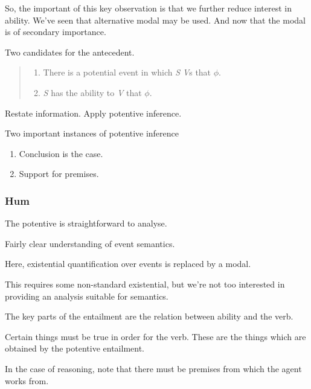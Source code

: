 \begin{note}
  So, the important of this key observation is that we further reduce interest in ability.
  We've seen that alternative modal may be used.
  And now that the modal is of secondary importance.
  
  
  
  Two candidates for the antecedent.
\begin{quote}
  \begin{enumerate}
  \item There is a potential event in which \emph{S} \emph{V}s that \(\phi\).
  \item \emph{S} has the ability to \emph{V} that \(\phi\).
  \end{enumerate}
  \end{quote}
\end{note}

\begin{note}
  Restate information.
  Apply potentive inference.

  Two important instances of potentive inference
  \begin{enumerate}
  \item Conclusion is the case.
  \item Support for premises.
  \end{enumerate}
\end{note}

\subsubsection{Hum}
\label{sec:hum}

\begin{note}[Potentive]
  The potentive is straightforward to analyse.

  Fairly clear understanding of event semantics.

  Here, existential quantification over events is replaced by a modal.

  This requires some non-standard existential, but we're not too interested in providing an analysis suitable for semantics.
\end{note}


\begin{note}
  The key parts of the entailment are the relation between ability and the verb.

  Certain things must be true in order for the verb.
  These are the things which are obtained by the potentive entailment.

  In the case of reasoning, note that there must be premises from which the agent works from.
\end{note}



